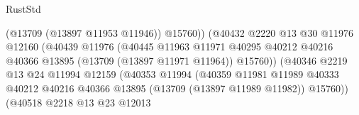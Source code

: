 \begin{lexlean}{RustStd}
\begin{coremodule}
                                                    (@13709 (@13897 @11953 @11946))
                                                    @15760))
                                                (@40432
                                                  @2220
                                                  @13
                                                  @30
                                                  @11976
                                                  @12160
                                                  (@40439
                                                    @11976
                                                    (@40445
                                                      @11963
                                                      @11971
                                                      @40295
                                                      @40212
                                                      @40216
                                                      @40366
                                                      @13895
                                                      (@13709 (@13897 @11971 @11964))
                                                      @15760))
                                                  (@40346
                                                    @2219
                                                    @13
                                                    @24
                                                    @11994
                                                    @12159
                                                    (@40353
                                                      @11994
                                                      (@40359
                                                        @11981
                                                        @11989
                                                        @40333
                                                        @40212
                                                        @40216
                                                        @40366
                                                        @13895
                                                        (@13709 (@13897 @11989 @11982))
                                                        @15760))
                                                    (@40518
                                                      @2218
                                                      @13
                                                      @23
                                                      @12013

\end{coremodule}
\end{lexlean}
